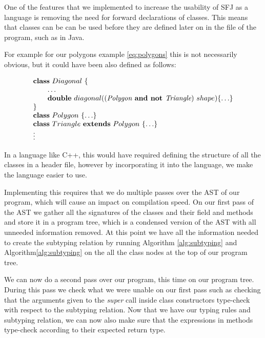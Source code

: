 \documentclass{l4proj}
\begin{document}
One of the features that we implemented to increase the usability of SFJ as a language is removing the need for forward declarations of classes.
This means that classes can be can be used before they are defined later on in the file of the program, such as in Java.

For example for our polygons example \ref{eq:polygons} this is not necessarily obvious, but it could have been also defined as follows:

\begin{equation}
    \begin{array}{l}
        \mathbf{class} \  Diagonal \ \{
        \\
        \qquad \ldots \\
        \qquad \textbf{double}\ diagonal((\textit{Polygon} \textbf{ and not }  \textit{Triangle}) \ shape)\{\ldots\}
        \\
        \}
        \\
        \mathbf{class} \  Polygon \ \{\ldots\}
        \\
        \mathbf{class} \  Triangle \ \mathbf{extends }\  Polygon\ \{\ldots\}
        \\
        \vdots
    \end{array}
\end{equation}

In a language like C++, this would have required defining the structure of all the classes in a header file, however by incorporating it into the language, we make the language easier to use.

Implementing this requires that we do multiple passes over the AST of our program, which will cause an impact on compilation speed.
On our first pass of the AST we gather all the signatures of the classes and their field and methods and store it in a program tree, which is a condensed version of the AST with all unneeded information removed. At this point we have all the information needed to create the subtyping relation by running Algorithm \ref{alg:subtyping} and Algorithm\ref{alg:subtyping} on the all the class nodes at the top of our program tree.

We can now do a second pass over our program, this time on our program tree.
During this pass we check what we were unable on our first pass such as checking that the arguments given to the \emph{super} call inside class constructors type-check with respect to the subtyping relation.
Now that we have our typing rules and subtyping relation, we can now also make sure that the expressions in methods type-check according to their expected return type.
\end{document}
